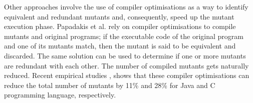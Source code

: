 Other approaches involve the use of compiler optimisations \cite{papadakis2015trivial,kintis2017detecting} as a way to identify equivalent and redundant mutants and, consequently, speed up the mutant execution phase. Papadakis et al. \cite{papadakis2015trivial, kintis2017detecting} rely on compiler optimisations to compile mutants and original programs; if the executable code of the original program and one of its mutants match, then the mutant is said to be equivalent and discarded. The same solution can be used to determine if one or more mutants are redundant with each other. The number of compiled mutants gets naturally reduced. Recent empirical studies \cite{kintis2017detecting}, shows that these compiler optimisations can reduce the total number of mutants by 11\% and 28\% for Java and C programming language, respectively.
